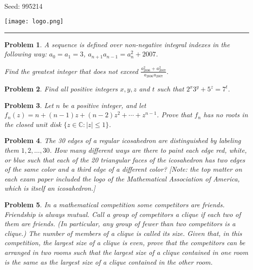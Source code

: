 \documentclass[12pt]{article}
\newtheorem{opg}{Problem}
\begin{document}
\parbox{0.6\textwidth}{ \\[2ex] {\Large Seed: 995214}}
\parbox{0.4\textwidth}{\texttt{[image: logo.png]}}

\hrule

\begin{opg}
A sequence is defined over non-negative integral indexes in the following way: $a_{0}=a_{1}=3$, $a_{n+1}a_{n-1}=a_{n}^{2}+2007$.

Find the greatest integer that does not exceed $\frac{a_{2006}^{2}+a_{2007}^{2}}{a_{2006}a_{2007}}.$


\end{opg}
\begin{opg}
Find all positive integers $x,y,z$ and $t$ such that $2^x3^y+5^z=7^t$.\end{opg}
\begin{opg}
Let $n$ be a positive integer, and let $f_n(z) = n + (n-1) z + (n-2)z^2 + \cdots + z^{n-1}$. Prove that
$f_n$ has no roots in the closed unit disk $\{z \in \mathbb{C}\colon |z| \leq 1 \}$.

\end{opg}
\begin{opg}
The 30 edges of a regular icosahedron are distinguished by labeling them $1,2,\dots,30$. How many different ways 
are there to paint each edge red, white, or blue such that each of the 20 triangular faces of the icosahedron has two edges of the same color and a third edge of a different color? [Note: the top matter on each exam paper included the logo of the Mathematical Association of America, which is itself an icosahedron.]

\end{opg}
\begin{opg}
In a mathematical competition some competitors are friends. Friendship is always mutual. Call a group of competitors a clique if each two of them are friends. (In particular, any group of fewer than two competitors is a clique.) The number of members of a clique is called its size. Given that, in this competition, the largest size of a clique is even, prove that the competitors can be arranged in two rooms such that the largest size of a clique contained in one room is the same as the largest size of a clique contained in the other room.


\end{opg}
\end{document}
